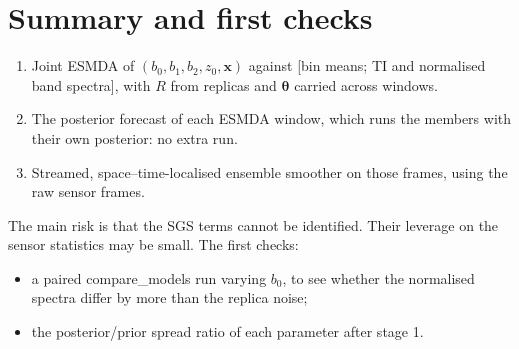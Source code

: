 \documentclass[11pt,a4paper]{article}
\begin{document}
\section{Summary and first checks}
\begin{enumerate}
\item Joint ESMDA of $(b_0,b_1,b_2,z_0,\bm x)$ against [bin means;
  TI and normalised band spectra], with $R$ from replicas and
  $\bm\theta$ carried across windows.
\item The posterior forecast of each ESMDA window, which runs the members with
  their own posterior: no extra run.
\item Streamed, space--time-localised ensemble smoother on those frames, using
  the raw sensor frames.
\end{enumerate}
\noindent The main risk is that the SGS terms cannot be identified. Their
leverage on the sensor statistics may be small. The first checks:
\begin{itemize}
\item a paired compare\_models run varying $b_0$, to see whether the
  normalised spectra differ by more than the replica noise;
\item the posterior/prior spread ratio of each parameter after stage 1.
\end{itemize}
\end{document}
